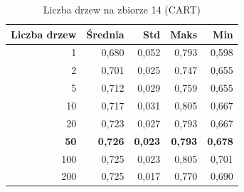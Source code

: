 \begin{table}[htbp]
\centering
\small
\setlength{\tabcolsep}{6pt}
\renewcommand{\arraystretch}{1.2}
\caption{Liczba drzew na zbiorze 14 (CART)}
\label{tab:CART_tree_count_14}
\begin{tabular}{r|r|r|r|r}
\toprule
Liczba drzew & Średnia & Std & Maks & Min \\
\hline
1 & 0,680 & 0,052 & 0,793 & 0,598 \\
2 & 0,701 & 0,025 & 0,747 & 0,655 \\
5 & 0,712 & 0,029 & 0,759 & 0,655 \\
10 & 0,717 & 0,031 & 0,805 & 0,667 \\
20 & 0,723 & 0,027 & 0,793 & 0,667 \\
\textbf{50} & \textbf{0,726} & \textbf{0,023} & \textbf{0,793} & \textbf{0,678} \\
100 & 0,725 & 0,023 & 0,805 & 0,701 \\
200 & 0,725 & 0,017 & 0,770 & 0,690 \\
\bottomrule
\end{tabular}
\end{table}